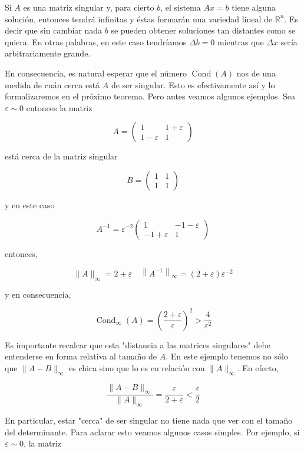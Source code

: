 \documentclass[10pt]{article}
\begin{document}
Si $A$ es una matriz singular y, para cierto $b$, el sistema $A x=b$ tiene alguna solución, entonces tendrá infinitas y éstas formarán una variedad lineal de $\mathbb{R}^{n}$. Es decir que sin cambiar nada $b$ se pueden obtener soluciones tan distantes como se quiera. En otras palabras, en este caso tendríamos $\Delta b=0$ mientras que $\Delta x$ sería arbitrariamente grande.

En consecuencia, es natural esperar que el número $\operatorname{Cond}(A)$ nos de una medida de cuán cerca está $A$ de ser singular. Esto es efectivamente así y lo formalizaremos en el próximo teorema. Pero antes veamos algunos ejemplos. Sea $\varepsilon \sim 0$ entonces la matriz

$$
A=\left(\begin{array}{cc}
1 & 1+\varepsilon \\
1-\varepsilon & 1
\end{array}\right)
$$

está cerca de la matriz singular

$$
B=\left(\begin{array}{ll}
1 & 1 \\
1 & 1
\end{array}\right)
$$

y en este caso

$$
A^{-1}=\varepsilon^{-2}\left(\begin{array}{cc}
1 & -1-\varepsilon \\
-1+\varepsilon & 1
\end{array}\right)
$$

entonces,

$$
\|A\|_{\infty}=2+\varepsilon \quad\left\|A^{-1}\right\|_{\infty}=(2+\varepsilon) \varepsilon^{-2}
$$

y en consecuencia,

$$
\operatorname{Cond}_{\infty}(A)=\left(\frac{2+\varepsilon}{\varepsilon}\right)^{2}>\frac{4}{\varepsilon^{2}}
$$

Es importante recalcar que esta "distancia a las matrices singulares" debe entenderse en forma relativa al tamaño de $A$. En este ejemplo tenemos no sólo que $\|A-B\|_{\infty}$ es chica sino que lo es en relación con $\|A\|_{\infty}$. En efecto,

$$
\frac{\|A-B\|_{\infty}}{\|A\|_{\infty}}=\frac{\varepsilon}{2+\varepsilon}<\frac{\varepsilon}{2}
$$

En particular, estar "cerca" de ser singular no tiene nada que ver con el tamaño del determinante. Para aclarar esto veamos algunos casos simples. Por ejemplo, si $\varepsilon \sim 0$, la matriz
\end{document}
